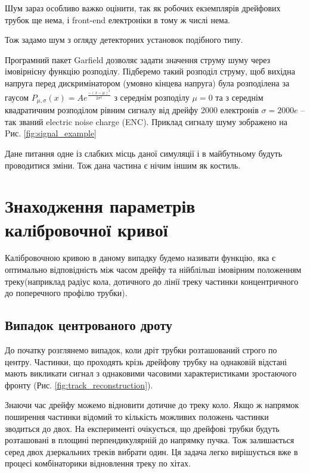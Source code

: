 \documentclass[]{article}
\begin{document}
	Шум зараз особливо важко оцінити, так як робочих екземплярів дрейфових трубок ще нема, і front-end електроніки в тому ж числі нема.
	
	Тож задамо шум з огляду детекторних установок подібного типу.
	
	Програмний пакет Garfield дозволяє задати значення струму шуму через імовірнісну функцію розподілу. Підберемо такий розподіл струму, щоб вихідна напруга перед дискримінатором (умовно кінцева напруга) була розподілена за гаусом 
	$P_{\mu,\sigma}(x) = Ae^{\frac{-(x-\mu)^2}{2\sigma^2}}$ 
	з середнім розподілу $\mu=0$ та з середнім квадратичним розподілом рівним сигналу від дрейфу 2000 електронів $ \sigma = 2000e$ -- так званий electric noise charge (ENC). Приклад сигналу шуму зображено на Pис. \ref{fig:signal_example}
	
	Дане питання одне із слабких місць даної симуляції і в майбутньому будуть проводитися зміни. Тож дана частина є нічим іншим як костиль.

	
	\section{Знаходження параметрів калібровочної кривої}
	
	Калібровочною кривою в даному випадку будемо називати функцію, яка є оптимально відповідність між часом дрейфу та нійблільш імовірним положенням треку(наприклад радіус кола, дотичного до лінії треку частинки концентричного до поперечного профілю трубки).\\
		
	\subsection{Випадок центрованого дроту}
	До початку розглянемо випадок, коли дріт трубки розташований строго по центру. Частинки, що проходять крізь дрейфову трубку на однаковій відстані мають викликати сигнал з однаковими часовими характеристиками зростаючого фронту (Рис. \ref{fig:track_reconstruction}). 
	
	Знаючи час дрейфу можемо відновити дотичне до треку коло. Якщо ж напрямок поширення частинки відомий то кількість можливих положень частинки зводиться до двох. На експерименті очікується, що дрейфові трубки будуть розташовані в площині перпендикулярній до напрямку пучка. Тож залишається серед двох дзеркальних треків вибрати один. Ця задача легко вирішується вже в процесі комбінаторики відновлення треку по хітах.
	
\end{document}
